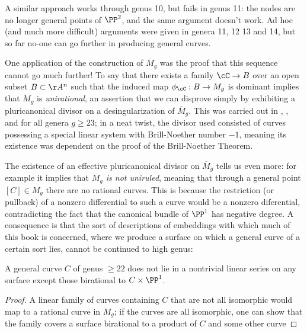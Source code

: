 A similar approach works through genus 10, but fails in genus 11: the nodes are no longer general points of $\PP^2$, and the same argument doesn't work.  Ad hoc (and much more difficult) arguments were given in genera 11, 12 13 and 14, but so far no-one can go further in producing general curves. 

One application of the construction of $\overline M_g$ was the proof that this sequence cannot go much further! To say that there exists a family $\cC \to B$ over an open subset $B \subset \AA^n$ such that the induced map $\phi_\cC : B \to M_g$ is dominant implies that $M_g$ is \emph{unirational}, an assertion that we can disprove simply by exhibiting a pluricanonical divisor on a desingularization of $\overline M_g$. This was carried out in
\cite{Harris-MumfordModuli}, \cite{HarrisModuli}, and \cite{Eisenbud-HarrisModuli}
 for all genera $g \geq 23$; in a neat twist, the divisor used consisted of curves possessing a special linear system with Brill-Noether number $-1$, meaning its existence was dependent on the proof of the Brill-Noether Theorem.

The existence of an effective pluricanonical divisor on $\overline M_g$ tells us even more: for example it implies that \emph{$M_g$ is not uniruled}, meaning that through a general point $[C] \in M_g$ there are no rational curves. This is because the restriction (or pullback) of a nonzero differential to such a curve would be a nonzero diferential, contradicting the fact that the canonical bundle of $\PP^1$ has  negative degree. A consequence is that the sort of descriptions of embeddings with which much of this book is concerned, where we produce a surface on which a general curve of a certain sort lies, cannot be continued to high genus:

\begin{corollary}
 A general curve $C$ of  genus $\geq 22$ does not lie in a nontrivial linear series on any surface
 except those birational to $C\times \PP^1$.
\end{corollary}
\begin{proof}
 A linear family of curves containing $C$ that are not all isomorphic would map to a rational curve in $M_g$; if the curves are all isomorphic, one can show that the family
 covers a surface birational to a product of $C$ and some other curve 
\end{proof}

